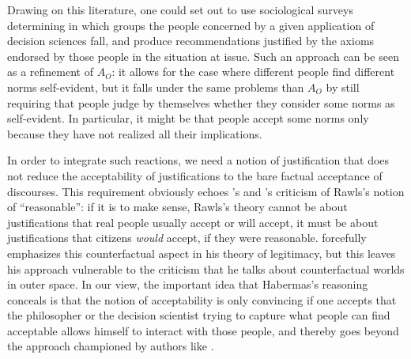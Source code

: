 \documentclass[preprint, french, english, 11pt, authoryear]{elsarticle}%
\begin{document}
Drawing on this literature, one could set out to use sociological surveys determining in which groups the people concerned by a given application of decision sciences fall, and produce recommendations justified by the axioms endorsed by those people in the situation at issue. Such an approach can be seen as a refinement of $A_O$: it allows for the case where different people find different norms self-evident, but it falls under the same problems than $A_O$ by still requiring that people judge by themselves whether they consider some norms as self-evident. In particular, it might be that people accept some norms only because they have not realized all their implications.

In order to integrate such reactions, we need a notion of justification that does not reduce the acceptability of justifications to the bare factual acceptance of discourses. This requirement obviously echoes \cite{habermas_reconciliation_1995}'s and \cite{estlund_democratic_2009}'s criticism of Rawls's notion of “reasonable”: if it is to make sense, Rawls's theory cannot be about justifications that real people usually accept or will accept, it must be about justifications that citizens \emph{would} accept, if they were reasonable. \citet{habermas_faktizitat_1992} forcefully emphasizes this counterfactual aspect in his theory of legitimacy, but this leaves his approach vulnerable to the criticism that he talks about counterfactual worlds in outer space. In our view, the important idea that Habermas's reasoning conceals is that the notion of acceptability is only convincing if one accepts that the philosopher or the decision scientist trying to capture what people can find acceptable allows himself to interact with those people, and thereby goes beyond the approach championed by authors like \cite{boltanski_justification_2006}.
\end{document}
